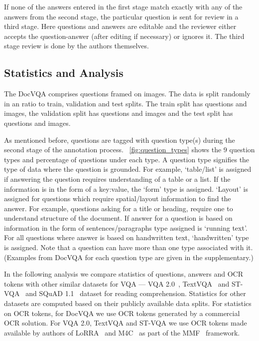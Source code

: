 \documentclass[10pt,twocolumn,letterpaper]{article}
\newcommand{\datasetName}{DocVQA\xspace}
\newcommand{\squad}{SQuAD 1.1\xspace}
\newcommand{\vqa}{VQA 2.0\xspace}
\newcommand{\textvqa}{TextVQA\xspace}
\newcommand{\stvqa}{ST-VQA\xspace}
\newcommand{\lorra}{LoRRA\xspace}
\newcommand{\mc}{M4C\xspace}
\begin{document}
If none of the answers entered in the first stage match exactly with any of the  answers from the second stage, the particular question is sent for review in a third stage. Here questions and answers are editable and the reviewer either accepts the question-answer (after editing if necessary) or ignores it. The third stage review is done by the authors themselves. 


\subsection{Statistics and Analysis}
\label{sec:stats_analysis}
The \datasetName comprises  questions framed on  images. The data is split randomly in an  ratio to train, validation and test splits. The train split has  questions and  images, the validation split has  questions and  images and the test split has  questions and  images.


As mentioned before, questions are tagged with question type(s) during the second stage of the annotation process.
~\autoref{fig:question_types} shows the 9 question types and percentage of questions under each type. A question type signifies the type of data where the question is grounded.
For example, `table/list' is assigned if answering the question requires understanding of  a table or a list. If the information is in the form of a key:value, the `form' type is assigned. `Layout' is assigned for questions which  require spatial/layout information to find the answer. For example, questions asking for a title or heading, require one to understand structure of the document.
If answer for a question is based on information in the form of sentences/paragraphs type assigned is `running text'. For all questions where answer is based on handwritten text, `handwritten' type is assigned. Note that a question can have more than one type associated with it. (Examples from \datasetName for each question type are given in the supplementary.)

In the following analysis we compare statistics of questions, answers and OCR tokens with other similar datasets for VQA --- \vqa~\cite{vqa2}, \textvqa~\cite{textvqa} and \stvqa~\cite{stvqa_iccv} and \squad~\cite{squad} dataset for reading comprehension. 
Statistics for other datasets are computed based on their publicly available data splits. 
For statistics on OCR tokens, for \datasetName we use OCR tokens generated by a commercial OCR solution. For \vqa, \textvqa and \stvqa we use OCR tokens made available by authors of \lorra~\cite{textvqa} and \mc~\cite{m4c} as part of the MMF~\cite{mmf} framework.
\end{document}
